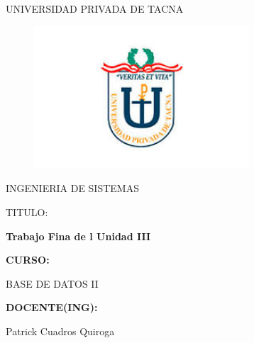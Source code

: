 \documentclass[%
 reprint,
 amsmath,amssymb,
 aps,
]{revtex4-1}
\begin{document}
\begin{titlepage}
\begin{center}
\large{UNIVERSIDAD PRIVADA DE TACNA}\\
\vspace*{-0.025in}
\begin{figure}[htb]
\begin{center}
\includegraphics[width=8cm]{./Imagenes/upt}
\end{center}
\end{figure}
\vspace*{0.15in}
INGENIERIA DE SISTEMAS  \\

\vspace*{0.5in}
\begin{large}
TITULO:\\
\end{large}

\vspace*{0.1in}
\begin{Large}
\textbf{Trabajo Fina de l Unidad III} \\
\end{Large}

\vspace*{0.3in}
\begin{Large}
\textbf{CURSO:} \\
\end{Large}

\vspace*{0.1in}
\begin{large}
BASE DE DATOS II\\
\end{large}

\vspace*{0.3in}
\begin{Large}
\textbf{DOCENTE(ING):} \\
\end{Large}

\vspace*{0.1in}
\begin{large}
 Patrick Cuadros Quiroga\\
\end{large}


\end{center}
\end{titlepage}
\end{document}
